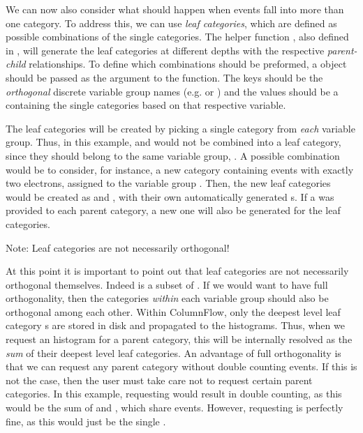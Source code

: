 We can now also consider what should happen when events fall into more than one category.
To address this, we can use \textit{leaf categories}, which are defined as possible combinations of the single categories.
The helper function , also defined in , will generate the leaf categories at different depths with the respective \textit{parent-child} relationships.
To define which combinations should be preformed, a  object should be passed as the  argument to the function.
The keys should be the \textit{orthogonal} discrete variable group names (e.g.  or ) and the values should be a  containing the single categories based on that respective variable.

The leaf categories will be created by picking a single category from \textit{each} variable group. Thus, in this example,  and  would not be combined into a leaf category, since they should belong to the same variable group, .
A possible combination would be to consider, for instance, a new category  containing events with exactly two electrons, assigned to the variable group .
Then, the new leaf categories would be created as  and , with their own automatically generated s. If a  was provided to each parent category, a new one will also be generated for the leaf categories.

\begin{tcolorbox}[colback=green!5!white,colframe=green!75!black,width=\textwidth]
Note: Leaf categories are not necessarily orthogonal!
\end{tcolorbox}

At this point it is important to point out that leaf categories are not necessarily orthogonal themselves. Indeed  is a subset of .
If we would want to have full orthogonality, then the categories \textit{within} each variable group should also be orthogonal among each other.
Within ColumnFlow, only the deepest level leaf category s are stored in disk and propagated to the histograms.
Thus, when we request an histogram for a parent category, this will be internally resolved as the \textit{sum} of their deepest level leaf categories.
An advantage of full orthogonality is that we can request any parent category without double counting events.
If this is not the case, then the user must take care not to request certain parent categories.
In this example, requesting  would result in double counting, as this would be the sum of  and , which share events.
However, requesting   is perfectly fine, as this would just be the single .


